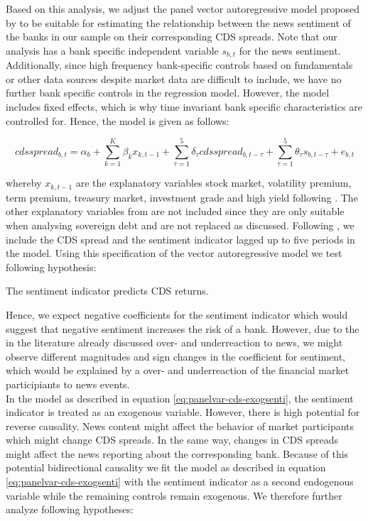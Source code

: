 Based on this analysis, we adjust the panel vector autoregressive model proposed by \cite{cathcart2020} to be suitable for estimating the relationship between the news sentiment of the banks in our sample on their corresponding CDS spreads. Note that our analysis has a bank specific independent variable $s_{b,t}$ for the news sentiment. Additionally, since high frequency bank-specific controls based on fundamentals or other data sources despite market data are difficult to include, we have no further bank specific controls in the regression model. However, the model includes fixed effects, which is why time invariant bank specific characteristics are controlled for. Hence, the model is given as follows:

\begin{equation} \label{eq:panelvar-cds-exogsenti}
	cdsspread_{b,t} = \alpha_b + \sum_{k=1}^K\beta_{k}x_{k,t-1} + \sum^5_{\tau=1} \delta_{\tau}cdsspread_{b,t-\tau} + \sum^5_{\tau=1}\theta_{\tau}s_{b,t-\tau} + e_{b,t}
\end{equation}

whereby $x_{k,t-1}$ are the explanatory variables stock market, volatility premium, term premium, treasury market, investment grade and high yield following \cite{cathcart2020}. The other explanatory variables from \cite{cathcart2020} are not included since they are only suitable when analysing sovereign debt and are not replaced as discussed. Following \cite{cathcart2020}, we include the CDS spread and the sentiment indicator lagged up to five periods in the model. Using this specification of the vector autoregressive model we test following hypothesis:

\begin{hyp}
	The sentiment indicator predicts CDS returns.
\end{hyp}

Hence, we expect negative coefficients for the sentiment indicator which would suggest that negative sentiment increases the risk of a bank. However, due to the in the literature already discussed over- and underreaction to news, we might observe different magnitudes and sign changes in the coefficient for sentiment, which would be explained by a over- and underreaction of the financial market participiants to news events. \\

In the model as described in equation \ref{eq:panelvar-cds-exogsenti}, the sentiment indicator is treated as an exogenous variable. However, there is high potential for reverse causality. News content might affect the behavior of market participants which might change CDS spreads. In the same way, changes in CDS spreads might affect the news reporting about the corresponding bank. Because of this potential bidirectional causality we fit the model as described in equation \ref{eq:panelvar-cds-exogsenti} with the sentiment indicator as a second endogenous variable while the remaining controls remain exogenous. We therefore further analyze following hypotheses:

